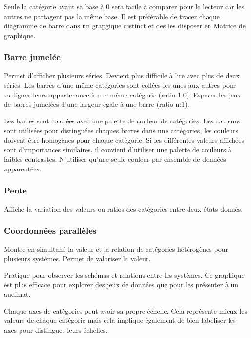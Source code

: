 \documentclass[a4paper,12pt]{article}
\begin{document}
\begin{multicols}{2}
Seule la catégorie ayant sa base à 0 sera facile à comparer pour le lecteur car les autres ne partagent pas la même base.\autocite{jonathanschwabishComparingCategories2021} Il est préférable de tracer chaque diagramme de barre dans un grapgique distinct et des les disposer en \hyperref[sec:org44b2ac7]{Matrice de graphique}. \autocite{jonathanschwabishComparingCategories2021}
\subsubsection*{Barre jumelée}
\label{sec:org2ae1350}
Permet d'afficher plusieurs séries. Devient plus difficile à lire avec plus de deux séries. \autocite{alansmithLexiqueVisuel}
Les barres d'une même catégories sont collées les unes aux autres pour souligner leurs appartenance à une même catégorie (ratio 1:0). Espacer les jeux de barres jumelées d'une largeur égale à une barre (ratio n:1).

Les barres sont colorées avec une palette de couleur de catégories. Les couleurs sont utilisées pour distinguées chaques barres dans une catégories, les couleurs doivent être homogènes pour chaque catégorie. Si les différentes valeurs affichées sont d'importances similaires, il convient d'utiliser une palette de couleurs à faibles contrastes. N'utiliser qu'une seule couleur par ensemble de données apparentées. \autocite{stephenfewComponentlevelGraphDesign2012}
\subsubsection*{Pente}
\label{sec:org9b6f15c}
Affiche la variation des valeurs ou ratios des catégories entre deux états donnés. \autocite{alansmithLexiqueVisuel}
\subsubsection*{Coordonnées parallèles}
\label{sec:orgc0ae941}
Montre en simultané la valeur et la relation de catégories hétérogènes pour plusieurs systèmes. \autocite{jonathanschwabishRelationship2021} Permet de valoriser la valeur. \autocite{alansmithLexiqueVisuel}

Pratique pour observer les schémas et relations entre les systèmes. \autocite{mikeyiHowChooseRight2020} Ce graphique est plus efficace pour explorer des jeux de données que pour les présenter à un audimat. \autocite{sosulskiGraphics2019}

Chaque axes de catégories peut avoir sa propre échelle. Cela représente mieux les valeurs de chaque catégorie mais cela implique également de bien labeliser les axes pour distinguer leurs échelles. \autocite{jonathanschwabishRelationship2021}


\end{multicols}
\end{document}
